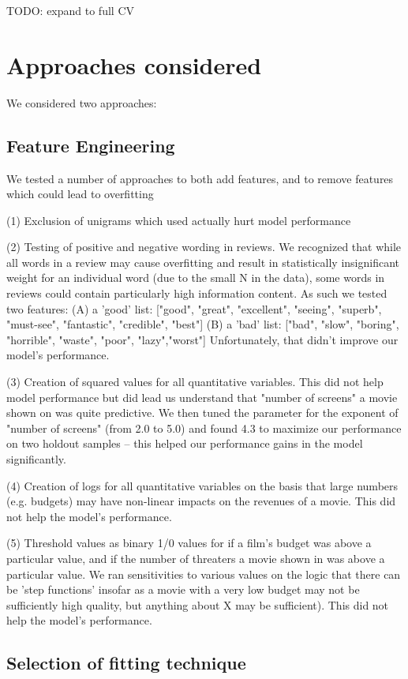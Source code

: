 \documentclass[11pt, oneside]{article}   	%
\begin{document}
TODO: expand to full CV

\section*{Approaches considered}
We considered two approaches: 


\subsection*{Feature Engineering}
We tested a number of approaches to both add features, and to remove features which could lead to overfitting

(1) Exclusion of unigrams which used actually hurt model performance

(2) Testing of positive and negative wording in reviews. We recognized that while all words in a review may cause overfitting and result in statistically insignificant weight for an individual word (due to the small N in the data), some words in reviews could contain particularly high information content. As such we tested two features:
	(A) a 'good' list: ["good", "great", "excellent", "seeing", "superb", "must-see", "fantastic", "credible", "best"]
	(B) a 'bad' list: ["bad", "slow", "boring", "horrible", "waste", "poor", "lazy","worst"]
Unfortunately, that didn't improve our model's performance.

(3) Creation of squared values for all quantitative variables. This did not help model performance but did lead us understand that "number of screens" a movie shown on was quite predictive. We then tuned the parameter for the exponent of "number of screens" (from 2.0 to 5.0) and found 4.3 to maximize our performance on two holdout samples -- this helped our performance gains in the model significantly.

(4) Creation of logs for all quantitative variables on the basis that large numbers (e.g. budgets) may have non-linear impacts on the revenues of a movie. This did not help the model's performance.

(5) Threshold values as binary 1/0 values for if a film's budget was above a particular value, and if the number of threaters a movie shown in was above a particular value. We ran sensitivities to various values on the logic that there can be 'step functions' insofar as a movie with a very low budget may not be sufficiently high quality, but anything about X may be sufficient). This did not help the model's performance.

\subsection*{Selection of fitting technique}
\end{document}
